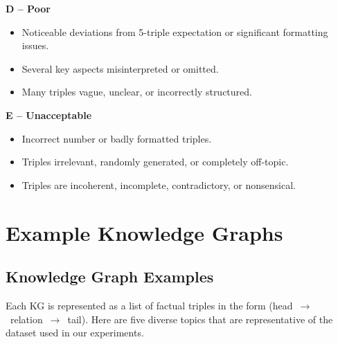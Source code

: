 \documentclass[11pt]{article}
\begin{document}
\noindent\textbf{D – Poor}
\begin{itemize}
\item Noticeable deviations from 5-triple expectation or significant formatting issues.
\item Several key aspects misinterpreted or omitted.
\item Many triples vague, unclear, or incorrectly structured.
\end{itemize}

\noindent\textbf{E – Unacceptable}
\begin{itemize}
\item Incorrect number or badly formatted triples.
\item Triples irrelevant, randomly generated, or completely off-topic.
\item Triples are incoherent, incomplete, contradictory, or nonsensical.
\end{itemize}

\section{Example Knowledge Graphs}
\label{sec:appendix-kgs}
\subsection{Knowledge Graph Examples}\label{sec:appendix-kgs1}
Each KG is represented as a list of factual triples in the
form \mbox{(head $\rightarrow$ relation $\rightarrow$ tail)}.  
Here are five diverse topics that are representative of the dataset used in
our experiments. 
\end{document}
